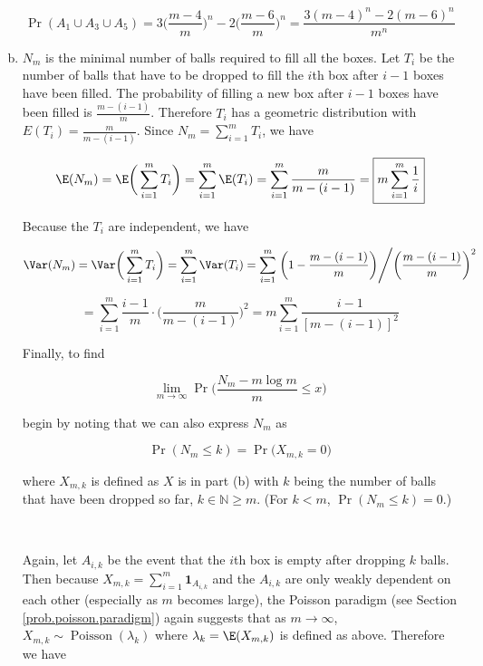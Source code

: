 \begin{enumerate}[(a)]
\[
\Pr(A_1 \cup A_3 \cup A_5) = 3\bigg(  \frac{m-4}{m} \bigg)^n -  2 \bigg(  \frac{m-6}{m} \bigg)^n  = \boxed{ \frac{3(m-4)^n - 2(m-6)^n}{m^n}}
\]

\item



\(N_m\) is the minimal number of balls required to fill all the boxes. Let \(T_i\) be the number of balls that have to be dropped to fill the \(i\)th box after \(i - 1\) boxes have been filled. The probability of filling a new box after \(i -1\) boxes have been filled is \( \frac{m - (i - 1)}{m}\). Therefore \(T_i\) has a geometric distribution with \(E(T_i) = \frac{m}{m - (i - 1)}\). Since \(N_m = \sum_{i=1}^m T_i\), we have


\[
\E(N_m) = \E \bigg(  \sum_{i=1}^m T_i   \bigg) =  \sum_{i=1}^m \E( T_i )  =  \sum_{i=1}^m \frac{m}{m - (i - 1)} = \boxed{m  \sum_{i=1}^m \frac{1}{i }}
\]

Because the \(T_i\) are independent, we have

\[
\Var(N_m) = \Var \bigg(  \sum_{i=1}^m T_i   \bigg) =  \sum_{i=1}^m \Var( T_i )  =  \sum_{i=1}^m \left. \bigg( 1 -  \frac{m - (i - 1)}{m} \bigg) \middle/ \bigg( \frac{m - (i - 1)}{m} \bigg)^2 \right.
\]

\[
=  \sum_{i=1}^m  \frac{  i - 1}{m} \cdot \bigg( \frac{m}{m - (i - 1)} \bigg)^2 = \boxed{  m\sum_{i=1}^m  \frac{ i - 1}{[m - (i - 1)]^2} }
\]


Finally, to find

\[
\lim_{m \to \infty} \Pr \bigg( \frac{N_m - m \log m}{m} \leq x \bigg) 
\]

begin by noting that we can also express \(N_m\) as 

\[
\Pr(N_m \leq k) = \Pr \big( X_{m, k} = 0 \big)
\]

where \(X_{m, k}\) is defined as \(X\) is in part (b) with \(k\) being the number of balls that have been dropped so far, \(k \in \mathbb{N} \geq m\). (For \(k < m\), \(\Pr(N_m \leq k) = 0\).)

\

Again, let \(A_{i,k}\) be the event that the \(i\)th box is empty after dropping \(k\) balls. Then because \(X_{m, k} = \sum_{i=1}^m \boldsymbol{1}_{A_{i,k}}\) and the \(A_{i,k}\) are only weakly dependent on each other (especially as \(m\) becomes large), the Poisson paradigm (see Section \ref{prob.poisson.paradigm}) again suggests that as \(m \to \infty\), \(X_{m, k} \sim \operatorname{Poisson}(\lambda_k)\) where \(\lambda_k = \E(X_{m,k})\) is defined as above. Therefore we have


\end{enumerate}
